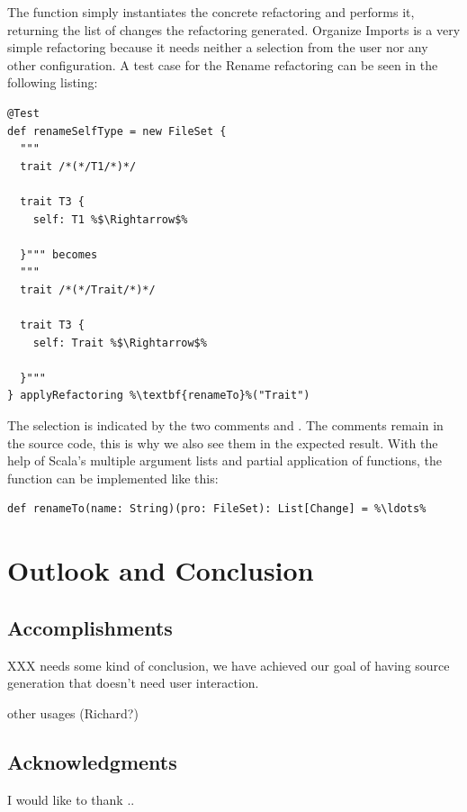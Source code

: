 \documentclass[10pt,a4paper,oneside]{scrreprt}
\begin{document}
The  function simply instantiates the concrete refactoring and performs it, returning the list of changes the refactoring generated. Organize Imports is a very simple refactoring because it needs neither a selection from the user nor any other configuration. A test case for the Rename refactoring can be seen in the following listing:

\begin{lstlisting}
@Test
def renameSelfType = new FileSet {
  """
  trait /*(*/T1/*)*/

  trait T3 {
    self: T1 %$\Rightarrow$%

  }""" becomes
  """
  trait /*(*/Trait/*)*/

  trait T3 {
    self: Trait %$\Rightarrow$%

  }"""
} applyRefactoring %\textbf{renameTo}%("Trait")
\end{lstlisting}

The selection is indicated by the two comments \src{/*(*/} and \src{/*)*/}. The comments remain in the source code, this is why we also see them in the expected result. With the help of Scala's multiple argument lists and partial application of functions, the  function can be implemented like this:

\begin{lstlisting}
def renameTo(name: String)(pro: FileSet): List[Change] = %\ldots%
\end{lstlisting}


\chapter{Outlook and Conclusion} \label{chapter:outlook}

\section{Accomplishments}

XXX needs some kind of conclusion, we have achieved our goal of having source generation that doesn't need user interaction.

other usages (Richard?)


\section{Acknowledgments}

I would like to thank ..
\end{document}
